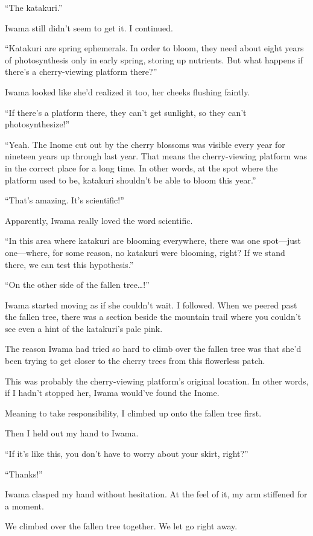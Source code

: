 \documentclass[
    a4paper,
    12pt,
    twoside,
    openany,
    UTF8,
    fontset=windows
]{ctexbook}
\begin{document}
``The katakuri.''

Iwama still didn't seem to get it. I continued.

``Katakuri are spring ephemerals. In order to bloom, they need about eight years of photosynthesis only in early spring, storing up nutrients. But what happens if there's a cherry-viewing platform there?''

Iwama looked like she'd realized it too, her cheeks flushing faintly.

``If there's a platform there, they can't get sunlight, so they can't photosynthesize!''

``Yeah. The Inome cut out by the cherry blossoms was visible every year for nineteen years up through last year. That means the cherry-viewing platform was in the correct place for a long time. In other words, at the spot where the platform used to be, katakuri shouldn't be able to bloom this year.''

``That's amazing. It's scientific!''

Apparently, Iwama really loved the word scientific.

``In this area where katakuri are blooming everywhere, there was one spot---just one---where, for some reason, no katakuri were blooming, right? If we stand there, we can test this hypothesis.''

``On the other side of the fallen tree\dots!''

Iwama started moving as if she couldn't wait. I followed. When we peered past the fallen tree, there was a section beside the mountain trail where you couldn't see even a hint of the katakuri's pale pink.

The reason Iwama had tried so hard to climb over the fallen tree was that she'd been trying to get closer to the cherry trees from this flowerless patch.

This was probably the cherry-viewing platform's original location. In other words, if I hadn't stopped her, Iwama would've found the Inome.

Meaning to take responsibility, I climbed up onto the fallen tree first.

Then I held out my hand to Iwama.

``If it's like this, you don't have to worry about your skirt, right?''

``Thanks!''

Iwama clasped my hand without hesitation. At the feel of it, my arm stiffened for a moment.

We climbed over the fallen tree together. We let go right away.
\end{document}
